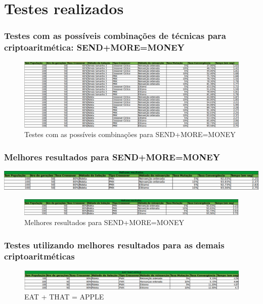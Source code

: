 \documentclass[hidelinks,12pt]{article}
\begin{document}
	
\section{Testes realizados}

		
	\subsubsection{Testes com as possíveis combinações de técnicas para criptoaritmética: SEND+MORE=MONEY}
	
		
		\begin{figure}[h!]
		\centering
		\includegraphics[scale=0.40]{Figures/1sendmoremoney}
		\caption{Testes com as possíveis combinações para SEND+MORE=MONEY}
		\end{figure}
	
	
	\subsubsection{Melhores resultados para SEND+MORE=MONEY}
	
		\includegraphics[width=\textwidth,height=\textheight,keepaspectratio]
		{Figures/melhoressendmoremoney.png}
		\begin{figure}[h!]
		\centering
		\includegraphics[scale=0.40]{Figures/melhoressendmoremoney}
		\caption{Melhores resultados para SEND+MORE=MONEY}
		\end{figure}
	
	\subsubsection{Testes utilizando melhores resultados para as demais criptoaritméticas}
	
		\begin{figure}[h!]
		\centering
		\includegraphics[scale=0.42]{Figures/eatthatapple}
		\caption{EAT + THAT = APPLE}
		\end{figure}
		
\end{document}
